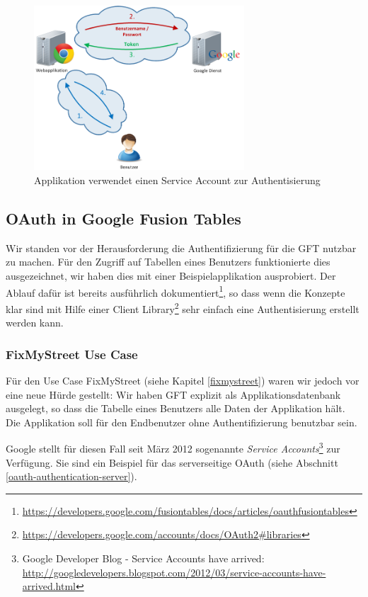 \begin{figure}[!ht]
	\centering
	\includegraphics[width=0.7\textwidth]{images/oauth/oauth-serviceaccount}
	\caption{Applikation verwendet einen Service Account zur Authentisierung}
	\label{oauth-serviceaccount}
\end{figure}

\subsection{OAuth in Google Fusion Tables}
Wir standen vor der Herausforderung die Authentifizierung für die GFT nutzbar zu machen. Für den Zugriff auf Tabellen eines Benutzers funktionierte dies ausgezeichnet, wir haben dies mit einer Beispielapplikation ausprobiert. Der Ablauf dafür ist bereits ausführlich dokumentiert\footnote{\url{https://developers.google.com/fusiontables/docs/articles/oauthfusiontables}}, so dass wenn die Konzepte klar sind mit Hilfe einer Client Library\footnote{\url{https://developers.google.com/accounts/docs/OAuth2\#libraries}} sehr einfach eine Authentisierung erstellt werden kann.

\subsubsection{FixMyStreet Use Case}
Für den Use Case FixMyStreet (siehe Kapitel \ref{fixmystreet}) waren wir jedoch vor eine neue Hürde gestellt: Wir haben GFT explizit als Applikationsdatenbank ausgelegt, so dass die Tabelle eines Benutzers alle Daten der Applikation hält. Die Applikation soll für den Endbenutzer ohne Authentifizierung benutzbar sein.

Google stellt für diesen Fall seit März 2012 sogenannte \emph{Service Accounts}\footnote{Google Developer Blog - Service Accounts have arrived: \url{http://googledevelopers.blogspot.com/2012/03/service-accounts-have-arrived.html}} zur Verfügung. Sie sind ein Beispiel für das serverseitige \gls{OAuth} (siehe Abschnitt \ref{oauth-authentication-server}).

